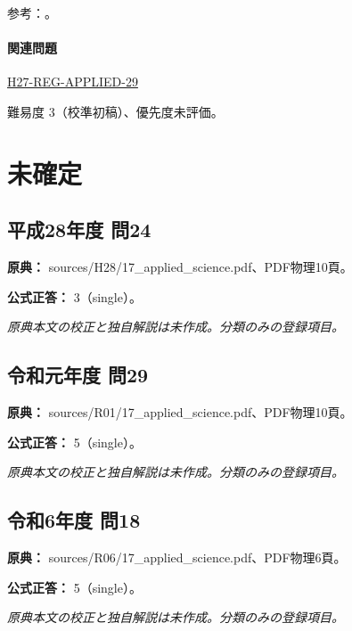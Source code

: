 \par 参考：\cite{mlit_masa,maff_shiras2017,mlit_peat,gsj_loess2002}。

\paragraph{関連問題} \hyperref[q:h27-reg-applied-29]{H27-REG-APPLIED-29}

\par 難易度 3（校準初稿）、優先度未評価。

\section{未確定}

\subsection{平成28年度 問24}
\label{q:h28-reg-applied-24}

\noindent\textbf{原典：} sources/H28/17\_applied\_science.pdf、PDF物理10頁。

\textbf{公式正答：} 3（single）。

\par\textit{原典本文の校正と独自解説は未作成。分類のみの登録項目。}

\subsection{令和元年度 問29}
\label{q:r01-reg-applied-29}

\noindent\textbf{原典：} sources/R01/17\_applied\_science.pdf、PDF物理10頁。

\textbf{公式正答：} 5（single）。

\par\textit{原典本文の校正と独自解説は未作成。分類のみの登録項目。}

\subsection{令和6年度 問18}
\label{q:r06-reg-applied-18}

\noindent\textbf{原典：} sources/R06/17\_applied\_science.pdf、PDF物理6頁。

\textbf{公式正答：} 5（single）。

\par\textit{原典本文の校正と独自解説は未作成。分類のみの登録項目。}
